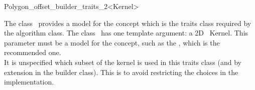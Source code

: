 

\begin{ccRefClass}{Polygon_offset_builder_traits_2<Kernel>}


\ccDefinition

The class \ccRefName\ provides a model for the
 concept which is the traits class
required by the  algorithm class. The class 
\ccRefName\ has one template argument: a 2D \cgal\ Kernel. This parameter must be a model for the  concept, such as the , which is the recommended one.\\
It is unspecified which subset of the kernel is used in this traits class (and by extension in the builder class). This is to avoid restricting the choices in the implementation.


\ccIsModel
{}\\
\\
\\

\ccSeeAlso
{}

\end{ccRefClass}


